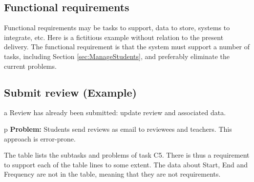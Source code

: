 \documentclass[Main]{subfiles}
\begin{document}
\subsection{Functional requirements}

Functional requirements may be tasks to support, data to store, systems to integrate, etc. 
Here is a fictitious example without relation to the present delivery. 
The functional requirement is that the system must support a number of tasks, including Section \ref{sec:ManageStudents}, and preferably eliminate the current problems.

\subsection{Submit review (Example)}

\colorbox{light-gray}{\begin{minipage}{\textwidth}
\begin{DataIntro}
\end{DataIntro}
\end{minipage}}


\colorbox{light-gray}{\begin{minipage}{\textwidth}
\begin{TaskTable}

\RecordAddi
{a}
{Review has already been submitted: update review and associated data.}{}


\RecordAddi
{p}
{\textbf{Problem:} Students send reviews as email to reviewees and teachers. This approach is error-prone.}{}{}
\end{TaskTable}
\end{minipage}}

The table lists the subtasks and problems of task C5. 
There is thus a requirement to support each of the table lines to some extent. 
The data about Start, End and Frequency are not in the table, meaning that they are not requirements.
\end{document}
